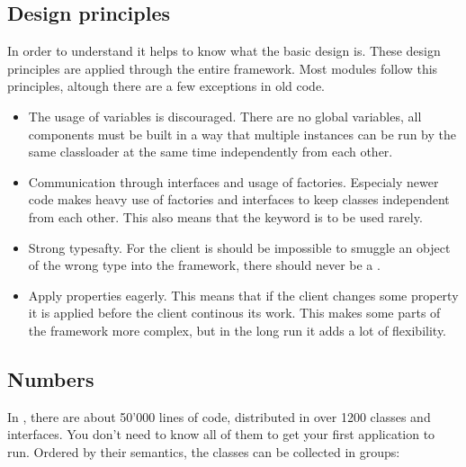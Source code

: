 


\subsection{Design principles}
In order to understand  it helps to know what the basic design is. These design principles are applied through the entire framework. Most modules follow this principles, altough there are a few exceptions in old code.

\begin{itemize}
 \item The usage of  variables is discouraged. There are no global variables, all components must be built in a way that multiple instances can be run by the same classloader at the same time independently from each other.
 \item Communication through interfaces and usage of factories. Especialy newer code makes heavy use of factories and interfaces to keep classes independent from each other. This also means that the keyword  is to be used rarely.
 \item Strong typesafty. For the client is should be impossible to smuggle an object of the wrong type into the framework, there should never be a .
 \item Apply properties eagerly. This means that if the client changes some property it is applied before the client continous its work. This makes some parts of the framework more complex, but in the long run it adds a lot of flexibility.
\end{itemize}

\subsection{Numbers}
In , there are about 50'000 lines of code, distributed in over 1200 classes and interfaces. You don't need to know all of them to get your first application to run. Ordered by their semantics, the classes can be collected in groups:

